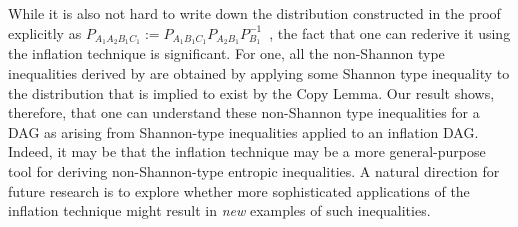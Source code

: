 \documentclass[aps,english,superscriptaddress,onecolumn,twoside,longbibliography,pra,floatfix,fleqn,nofootinbib]{revtex4-1}%
\theoremstyle{definition}
\begin{document}
While it is also not hard to write down the distribution constructed in the proof explicitly as $P_{A_1 A_2 B_1 C_1} := P_{A_1 B_1 C_1} P_{A_2 B_1} P_{B_1}^{-1}$~\cite[Lemma~15.8]{yeung_network_2008}, the fact that one can rederive it using the inflation technique is significant.  For one, all the non-Shannon type inequalities derived by \citet{zeger_2011_nonshannon} are obtained by applying some Shannon type inequality to the distribution that is implied to exist by the Copy Lemma.  Our result shows, therefore, that one can understand these non-Shannon type inequalities for a DAG as arising from Shannon-type inequalities applied to an inflation DAG.  Indeed, it may be that the inflation technique may be a more general-purpose tool for deriving non-Shannon-type entropic inequalities.  A natural direction for future research is to explore whether more sophisticated applications of the inflation technique might result  in \emph{new} examples of such inequalities. 

\end{document}
